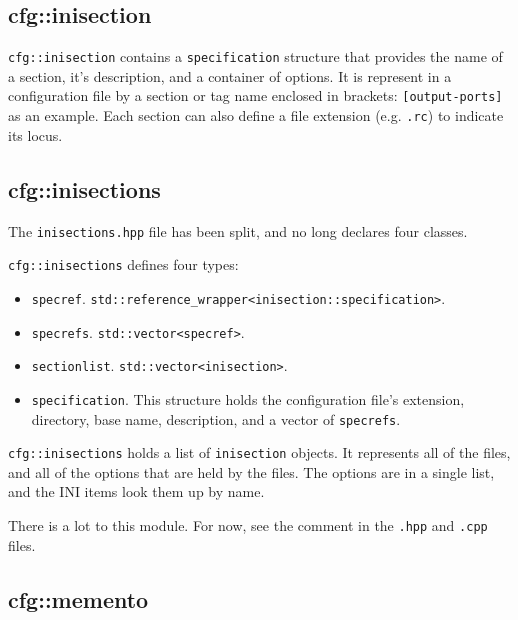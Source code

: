 \subsection{cfg::inisection}
\label{subsec:cfg_namespace_inisection}

   \texttt{cfg::inisection}  contains a \texttt{specification} structure that
   provides the name of a section, it's description, and
   a container of options.
   It is represent in a configuration file by a section or tag name
   enclosed in brackets:  \texttt{[output-ports]} as an example.
   Each section can also define a file extension
   (e.g. \texttt{.rc}) to indicate its locus.

\subsection{cfg::inisections}
\label{subsec:cfg_namespace_inisections}

   The \texttt{inisections.hpp} file has been split,
   and no long declares four classes.

   \texttt{cfg::inisections} defines four types:

   \begin{itemize}
      \item \texttt{specref}.
          \texttt{std::reference\_wrapper<inisection::specification>}.
      \item \texttt{specrefs}.
          \texttt{std::vector<specref>}.
      \item \texttt{sectionlist}.
         \texttt{std::vector<inisection>}.
      \item \texttt{specification}.
         This structure holds the configuration file's extension,
         directory, base name, description, and a vector of
         \texttt{specrefs}.
   \end{itemize}

   \texttt{cfg::inisections} holds a list of \texttt{inisection} objects.
   It represents all of the files, and all of
   the options that are held by the files.
   The options are in a single list,
   and the INI items look them up by name.

   There is a lot to this module.
   For now, see the comment in the \texttt{.hpp} and \texttt{.cpp} files.

\subsection{cfg::memento}
\label{subsec:cfg_namespace_memento}

